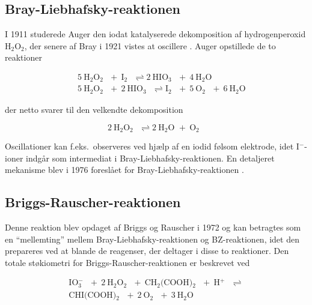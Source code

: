 \subsection{Bray-Liebhafsky-reaktionen}
{
\newcommand{\htooto} {\mbox{H$_2$O$_2$ }}
\newcommand{\iodat}  {\mbox{IO$_3^-$ }}
\newcommand{\hiodat} {\mbox{HIO$_3$ }}
\newcommand{\iod}    {\mbox{I$_2$ }}
\newcommand{\oxy}    {\mbox{O$_2$ }}
\newcommand{\htoo}   {\mbox{H$_2$O }}

I 1911 studerede Auger \cite{Auger} den iodat katalyserede
dekomposition af hydrogenperoxid H$_2$O$_2$, der senere af
Bray i 1921 vistes at oscillere \cite{Bray}. Auger
opstillede de to reaktioner

\begin{eqnarray}
  &&5~\htooto +~\iod \rightleftharpoons 2~\hiodat +~4~\htoo\\
  &&5~\htooto +~2~\hiodat \rightleftharpoons \iod +~5~\oxy +~6~\htoo
\end{eqnarray}

der netto svarer til den vel\-kendte dekomposition

\begin{equation}
  2~\htooto \rightleftharpoons 2~\htoo +~\oxy
\end{equation}

Oscillationer kan f.eks.\ observeres ved hj{\ae}lp af en
iodid f{\o}lsom elektrode, idet I$^-$-ioner indg{\aa}r som
intermediat i Bray-Liebhafsky-reaktionen. En detaljeret
mekanisme blev i 1976 foresl{\aa}et for
Bray-Liebhafsky-reaktionen \cite{BrayModel}. 
}

\subsection{Briggs-Rauscher-reaktionen}
{
\newcommand{\htooto} {\mbox{H$_2$O$_2$ }}
\newcommand{\iodat}  {\mbox{IO$_3^-$ }}
\newcommand{\malon}  {\mbox{CH$_2$(COOH)$_2$ }}
\newcommand{\maloni} {\mbox{CHI(COOH)$_2$ }}
\newcommand{\oxy}    {\mbox{O$_2$ }}
\newcommand{\htoo}   {\mbox{H$_2$O }}
\newcommand{\prot}   {\mbox{H$^+$ }}
Denne reaktion blev opdaget af Briggs og Rauscher i 1972
\cite{BriggsRauscher} og kan betragtes som en
``mellemting'' mellem Bray-Liebhafsky-reaktionen og
BZ-reaktionen, idet den prepareres ved at blande de
reagenser, der deltager i disse to reaktioner. Den totale
st{\o}kiometri for Briggs-Rauscher-reaktionen er beskrevet
ved

\begin{eqnarray}
&\iodat +~2~\htooto +~\malon +~\prot \rightleftharpoons&\nonumber\\
&\maloni +~2~\oxy +~3~\htoo&
\end{eqnarray}
}

